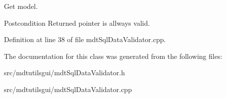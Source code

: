 Get model. 

\begin{DoxyPostcond}{Postcondition}
Returned pointer is allways valid. 
\end{DoxyPostcond}


Definition at line 38 of file mdtSqlDataValidator.cpp.



The documentation for this class was generated from the following files:\begin{DoxyCompactItemize}
\item 
src/mdtutilsgui/mdtSqlDataValidator.h\item 
src/mdtutilsgui/mdtSqlDataValidator.cpp\end{DoxyCompactItemize}
